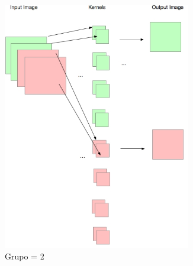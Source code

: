 \begin{itemize}
\begin{figure}[H]
\begin{subfigure}{.33\textwidth}
        \includegraphics[width =0.9\textwidth]{images/group/g2.jpg}
  \caption{Grupo = 2}
  \label{fig:sfig2}
\end{subfigure}
\begin{subfigure}{.33\textwidth}
  \centering

\end{subfigure}
\end{figure}
\end{itemize}
